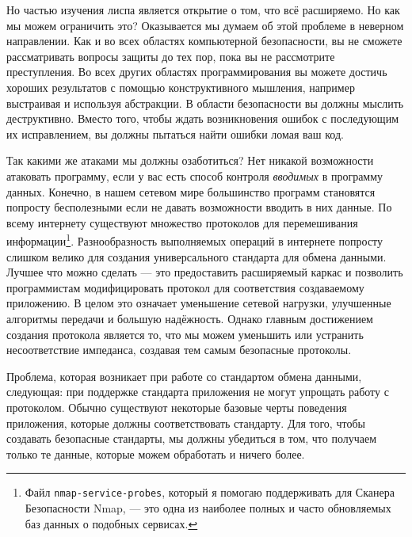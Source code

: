 Но частью изучения лиспа является открытие о том, что всё расширяемо. Но как мы можем ограничить это? Оказывается мы думаем об этой проблеме в неверном направлении. Как и во всех областях компьютерной безопасности, вы не сможете рассматривать вопросы защиты до тех пор, пока вы не рассмотрите преступления. Во всех других областях программирования вы можете достичь хороших результатов с помощью конструктивного мышления, например выстраивая и используя абстракции. В области безопасности вы должны мыслить деструктивно. Вместо того, чтобы ждать возникновения ошибок с последующим их исправлением, вы должны пытаться найти ошибки ломая ваш код.

Так какими же атаками мы должны озаботиться? Нет никакой возможности атаковать программу, если у вас есть способ контроля \emph{вводимых} в программу данных. Конечно, в нашем сетевом мире большинство программ становятся попросту бесполезными если не давать возможности вводить в них данные. По всему интернету существуют множество протоколов для перемешивания информации\footnote{Файл \verb"nmap-service-probes", который я помогаю поддерживать для Сканера Безопасности Nmap, --- это одна из наиболее полных и часто обновляемых баз данных о подобных сервисах.}. Разнообразность выполняемых операций в интернете попросту слишком велико для создания универсального стандарта для обмена данными. Лучшее что можно сделать --- это предоставить расширяемый каркас и позволить программистам модифицировать протокол для соответствия создаваемому приложению. В целом это означает уменьшение сетевой нагрузки, улучшенные алгоритмы передачи и большую надёжность. Однако главным достижением создания протокола является то, что мы можем уменьшить или устранить несоответствие импеданса, создавая тем самым безопасные протоколы.

Проблема, которая возникает при работе со стандартом обмена данными, следующая: при поддержке стандарта приложения не могут упрощать работу с протоколом. Обычно существуют некоторые базовые черты поведения приложения, которые должны соответствовать стандарту. Для того, чтобы создавать безопасные стандарты, мы должны убедиться в том, что получаем только те данные, которые можем обработать и ничего более.

